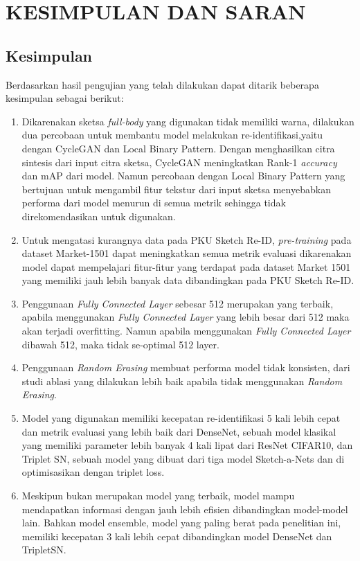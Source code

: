\chapter{KESIMPULAN DAN SARAN}
\label{chap:penutup}


\section{Kesimpulan}
\label{sec:kesimpulan}

Berdasarkan hasil pengujian yang telah dilakukan dapat ditarik beberapa kesimpulan sebagai berikut:

\begin{enumerate}[nolistsep]

  \item Dikarenakan sketsa \textit{full-body} yang digunakan tidak memiliki warna, dilakukan dua percobaan untuk membantu model melakukan re-identifikasi,yaitu dengan CycleGAN dan Local Binary Pattern. Dengan menghasilkan citra sintesis dari input citra sketsa, CycleGAN meningkatkan Rank-1 \textit{accuracy} dan mAP dari model. Namun percobaan dengan {Local Binary Pattern} yang bertujuan untuk mengambil fitur tekstur dari input sketsa menyebabkan performa dari model menurun di semua metrik sehingga tidak direkomendasikan untuk digunakan.
  
  \item Untuk mengatasi kurangnya data pada PKU Sketch Re-ID, \textit{pre-training} pada dataset Market-1501 dapat meningkatkan semua metrik evaluasi dikarenakan model dapat mempelajari fitur-fitur yang terdapat pada dataset Market 1501 yang memiliki jauh lebih banyak data dibandingkan pada PKU Sketch Re-ID.
  
  \item Penggunaan \textit{Fully Connected Layer} sebesar 512 merupakan yang terbaik, apabila menggunakan \textit{Fully Connected Layer} yang lebih besar dari 512 maka akan terjadi overfitting. Namun apabila menggunakan \textit{Fully Connected Layer} dibawah 512, maka tidak se-optimal 512 layer. 
  
  \item Penggunaan \textit{Random Erasing} membuat performa model tidak konsisten, dari studi ablasi yang dilakukan lebih baik apabila tidak menggunakan \textit{Random Erasing}.
  
  \item Model yang digunakan memiliki kecepatan re-identifikasi 5 kali lebih cepat dan metrik evaluasi yang lebih baik dari DenseNet, sebuah model klasikal yang memiliki parameter lebih banyak 4 kali lipat dari ResNet CIFAR10, dan Triplet SN, sebuah model yang dibuat dari tiga model Sketch-a-Nets dan di optimisasikan dengan triplet loss.

  \item Meskipun bukan merupakan model yang terbaik, model mampu mendapatkan informasi dengan jauh lebih efisien dibandingkan model-model lain. Bahkan model ensemble, model yang paling berat pada penelitian ini, memiliki kecepatan 3 kali lebih cepat dibandingkan model DenseNet dan TripletSN.
  

\end{enumerate}

